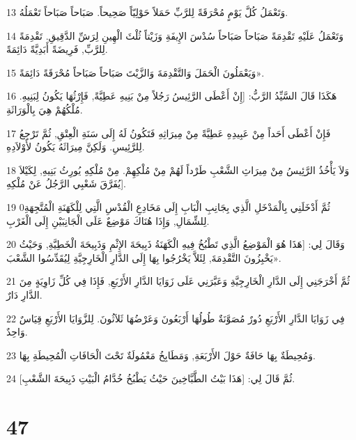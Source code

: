 \par 13 وَتَعْمَلُ كُلَّ يَوْمٍ مُحْرَقَةً لِلرَّبِّ حَمَلاً حَوْلِيّاً صَحِيحاً. صَبَاحاً صَبَاحاً تَعْمَلُهُ.
\par 14 وَتَعْمَلُ عَلَيْهِ تَقْدِمَةً صَبَاحاً صَبَاحاً سُدْسَ الإِيفَةِ وَزَيْتاً ثُلْثَ الْهِينِ لِرَشِّ الدَّقِيقِ. تَقْدِمَةً لِلرَّبِّ, فَرِيضَةً أَبَدِيَّةً دَائِمَةً.
\par 15 وَيَعْمَلُونَ الْحَمَلَ وَالتَّقْدِمَةَ وَالزَّيْتَ صَبَاحاً صَبَاحاً مُحْرَقَةً دَائِمَةً».
\par 16 هَكَذَا قَالَ السَّيِّدُ الرَّبُّ: [إِنْ أَعْطَى الرَّئِيسُ رَجُلاً مِنْ بَنِيهِ عَطِيَّةً, فَإِرْثُهَا يَكُونُ لِبَنِيهِ. مُلْكُهُمْ هِيَ بِالْوَرَاثَةِ.
\par 17 فَإِنْ أَعْطَى أَحَداً مِنْ عَبِيدِهِ عَطِيَّةً مِنْ مِيرَاثِهِ فَتَكُونُ لَهُ إِلَى سَنَةِ الْعِتْقِ, ثُمَّ تَرْجِعُ لِلرَّئِيسِ. وَلَكِنَّ مِيرَاثَهُ يَكُونُ لأَوْلاَدِهِ.
\par 18 وَلاَ يَأْخُذُ الرَّئِيسُ مِنْ مِيرَاثِ الشَّعْبِ طَرْداً لَهُمْ مِنْ مُلْكِهِمْ. مِنْ مُلْكِهِ يُورِثُ بَنِيهِ, لِكَيْلاَ يُفَرَّقَ شَعْبِي الرَّجُلُ عَنْ مُلْكِهِ].
\par 19 0ثُمَّ أَدْخَلَنِي بِالْمَدْخَلِ الَّذِي بِجَانِبِ الْبَابِ إِلَى مَخَادِعِ الْقُدْسِ الَّتِي لِلْكَهَنَةِ الْمُتَّجِهَةِ لِلشِّمَالِ, وَإِذَا هُنَاكَ مَوْضِعٌ عَلَى الْجَانِبَيْنِ إِلَى الْغَرْبِ.
\par 20 وَقَالَ لِي: [هَذَا هُوَ الْمَوْضِعُ الَّذِي تَطْبُخُ فِيهِ الْكَهَنَةُ ذَبِيحَةَ الإِثْمِ وَذَبِيحَةَ الْخَطِيَّةِ, وَحَيْثُ يَخْبِزُونَ التَّقْدِمَةَ, لِئَلاَّ يَخْرُجُوا بِهَا إِلَى الدَّارِ الْخَارِجِيَّةِ لِيُقَدِّسُوا الشَّعْبَ».
\par 21 ثُمَّ أَخْرَجَنِي إِلَى الدَّارِ الْخَارِجِيَّةِ وَعَبَّرَنِي عَلَى زَوَايَا الدَّارِ الأَرْبَعِ, فَإِذَا فِي كُلِّ زَاوِيَةٍ مِنَ الدَّارِ دَارٌ.
\par 22 فِي زَوَايَا الدَّارِ الأَرْبَعِ دُورٌ مُصَوَّنَةٌ طُولُهَا أَرْبَعُونَ وَعَرْضُهَا ثَلاَثُونَ. لِلزَّوَايَا الأَرْبَعِ قِيَاسٌ وَاحِدٌ.
\par 23 وَمُحِيطَةٌ بِهَا حَافَةٌ حَوْلَ الأَرْبَعَةِ, وَمَطَابِخُ مَعْمُولَةٌ تَحْتَ الْحَافَاتِ الْمُحِيطَةِ بِهَا.
\par 24 ثُمَّ قَالَ لِي: [هَذَا بَيْتُ الطَّبَّاخِينَ حَيْثُ يَطْبُخُ خُدَّامُ الْبَيْتِ ذَبِيحَةَ الشَّعْبِ].

\chapter{47}

